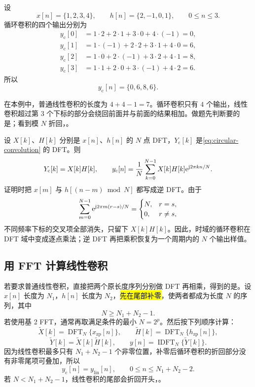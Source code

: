\begin{example}
  设
  \[
    x[n]=\{1,2,3,4\},\qquad
    h[n]=\{2,-1,0,1\},
    \qquad 0\le n\le3.
  \]
  循环卷积的四个输出分别为
  \begin{align*}
    y_{\mathrm c}[0]&=1\cdot2+2\cdot1+3\cdot0+4\cdot(-1)=0,\\
    y_{\mathrm c}[1]&=1\cdot(-1)+2\cdot2+3\cdot1+4\cdot0=6,\\
    y_{\mathrm c}[2]&=1\cdot0+2\cdot(-1)+3\cdot2+4\cdot1=8,\\
    y_{\mathrm c}[3]&=1\cdot1+2\cdot0+3\cdot(-1)+4\cdot2=6.
  \end{align*}
  所以
  \[
    y_{\mathrm c}[n]=\{0,6,8,6\}.
  \]
\end{example}

在本例中，普通线性卷积的长度为 $4+4-1=7$。循环卷积只有 $4$ 个输出，线性卷积超过第 $3$ 个下标的部分会绕回前面并与前面的结果相加。做题先判断要的是；看到模 $N$ 折回，。

设 $X[k]$、$H[k]$ 分别是 $x[n]$、$h[n]$ 的 $N$ 点 DFT，$Y_{\mathrm c}[k]$ 是\cref{eq:circular-convolution} 的 DFT。则
\begin{equation}
  Y_{\mathrm c}[k]=X[k]H[k],
  \qquad
  y_{\mathrm c}[n]
  =\frac1N\sum_{k=0}^{N-1}X[k]H[k]\mathrm{e}^{\mathrm{j}2\pi kn/N}.
  \label{eq:dft-circular-product}
\end{equation}
证明时把 $x[m]$ 与 $h[(n-m)\bmod N]$ 都写成逆 DFT。由于
\[
  \sum_{m=0}^{N-1}\mathrm{e}^{\mathrm{j}2\pi m(r-s)/N}
  =
  \begin{cases}
    N,&r=s,\\
    0,&r\ne s,
  \end{cases}
\]
不同频率下标的交叉项全部消失，只留下 $X[k]H[k]$。因此，时域的循环卷积在 DFT 域中变成逐点乘法；逆 DFT 再把乘积恢复为一个周期内的 $N$ 个输出样值。

\subsection{用 FFT 计算线性卷积}
\label{sec:fft-linear-convolution}

若要求普通线性卷积，直接把两个原长度序列分别做 DFT 再相乘，得到的是。设 $x[n]$ 长度为 $N_1$，$h[n]$ 长度为 $N_2$，\hl{先在尾部补零}，使两者都成为长度 $N$ 的序列，其中
\begin{equation}
  N\ge N_1+N_2-1.
  \label{eq:fft-zero-padding}
\end{equation}
若使用基 2 FFT，通常再取满足条件的最小 $N=2^p$。然后按下列顺序计算：
\[
  \widetilde X[k]=\operatorname{DFT}_N\{x_{\mathrm{zp}}[n]\},\qquad
  \widetilde H[k]=\operatorname{DFT}_N\{h_{\mathrm{zp}}[n]\},
\]
\[
  \widetilde Y[k]=\widetilde X[k]\widetilde H[k],
  \qquad
  y[n]=\operatorname{IDFT}_N\{\widetilde Y[k]\}.
\]
因为线性卷积最多只有 $N_1+N_2-1$ 个非零位置，补零后循环卷积的折回部分没有非零尾项可叠加，所以
\[
  y_{\mathrm c}[n]=y_{\mathrm{lin}}[n],
  \qquad 0\le n\le N_1+N_2-2.
\]
若 $N<N_1+N_2-1$，线性卷积的尾部会折回开头，。

